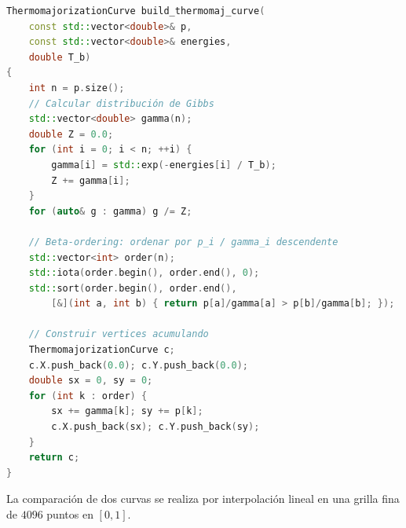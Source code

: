 \begin{lstlisting}[language=C++, caption={Construcción de la curva de Lorenz térmica}, label={lst:thermomaj_cpp}]
ThermomajorizationCurve build_thermomaj_curve(
    const std::vector<double>& p,
    const std::vector<double>& energies,
    double T_b) 
{
    int n = p.size();
    // Calcular distribución de Gibbs
    std::vector<double> gamma(n);
    double Z = 0.0;
    for (int i = 0; i < n; ++i) {
        gamma[i] = std::exp(-energies[i] / T_b);
        Z += gamma[i];
    }
    for (auto& g : gamma) g /= Z;
    
    // Beta-ordering: ordenar por p_i / gamma_i descendente
    std::vector<int> order(n);
    std::iota(order.begin(), order.end(), 0);
    std::sort(order.begin(), order.end(),
        [&](int a, int b) { return p[a]/gamma[a] > p[b]/gamma[b]; });
    
    // Construir vertices acumulando
    ThermomajorizationCurve c;
    c.X.push_back(0.0); c.Y.push_back(0.0);
    double sx = 0, sy = 0;
    for (int k : order) {
        sx += gamma[k]; sy += p[k];
        c.X.push_back(sx); c.Y.push_back(sy);
    }
    return c;
}
\end{lstlisting}
%
\noindent La comparación de dos curvas se realiza por interpolación lineal en 
una grilla fina de $4096$ puntos en $[0, 1]$.
